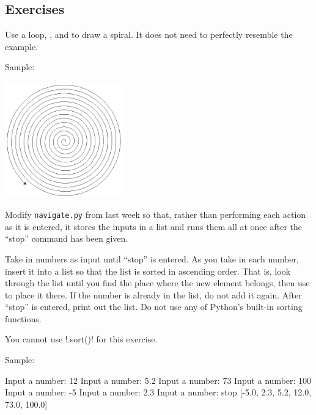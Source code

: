 \documentclass[11pt]{cselabheader}
\begin{document}
\subsection{Exercises}
\label{subsec:forex}

\begin{ex}[spiral.py] Use a  loop, , and
   to draw a spiral. It does not need to perfectly resemble
  the example.

  Sample:
  \begin{center}
    \includegraphics[width=2.0in]{img/spiral}
  \end{center}
\end{ex}

\begin{ex}[navigate2.py] Modify \texttt{navigate.py} from last week so that,
  rather than performing each action as it is entered, it stores the inputs in a
  list and runs them all at once after the ``stop'' command has been given.
\end{ex}

\begin{ex}[sorted.py] Take in numbers as input until ``stop'' is entered. As you
  take in each number, insert it into a list so that the list is sorted in
  ascending order. That is, look through the list until you find the place where
  the new element belongs, then use  to place it there.
  If the number is already in the list, do not add it again. After ``stop'' is
  entered, print out the list. Do not use any of Python's built-in sorting
  functions.

  You cannot use \pythoninline!.sort()! for this exercise.

  Sample:

  \begin{verbatimcode}
Input a number: 12
Input a number: 5.2
Input a number: 73
Input a number: 100
Input a number: -5
Input a number: 2.3
Input a number: stop
[-5.0, 2.3, 5.2, 12.0, 73.0, 100.0]
  \end{verbatimcode}

\end{ex}
\end{document}
